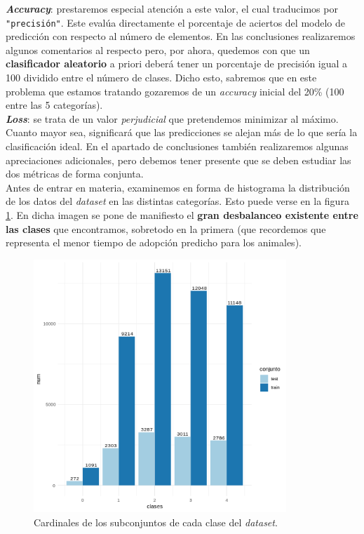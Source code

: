 \documentclass[]{article}
\begin{document}
	{\large \textbf{\textit{Accuracy}}}: prestaremos especial atención a este valor, el cual traducimos por \verb|"precisión"|. Este evalúa directamente el porcentaje de aciertos del modelo de predicción con respecto al número de elementos. En las conclusiones realizaremos algunos comentarios al respecto pero, por ahora, quedemos con que un \textbf{clasificador aleatorio} a priori deberá tener un porcentaje de precisión igual a 100 dividido entre el número de clases. Dicho esto, sabremos que en este problema que estamos tratando gozaremos de un \textit{accuracy} inicial del 20\% (100 entre las 5 categorías).\\
	
	{\large \textbf{\textit{Loss}}}: se trata de un valor \textit{perjudicial} que pretendemos minimizar al máximo. Cuanto mayor sea, significará que las predicciones se alejan más de lo que sería la clasificación ideal. En el apartado de conclusiones también realizaremos algunas apreciaciones adicionales, pero debemos tener presente que se deben estudiar las dos métricas de forma conjunta.\\
	
	Antes de entrar en materia, examinemos en forma de histograma la distribución de los datos del \textit{dataset} en las distintas categorías. Esto puede verse en la figura \ref{histogram}. En dicha imagen se pone de manifiesto el \textbf{gran desbalanceo existente entre las clases} que encontramos, sobretodo en la primera (que recordemos que representa el menor tiempo de adopción predicho para los animales).\\
	
	\begin{figure}[h]
		\centering
		\includegraphics[width=0.85\textwidth]{./img/bp_dataset_particionado}
		\caption{Cardinales de los subconjuntos de cada clase del \textit{dataset}.}
		\label{histogram}
	\end{figure}
\end{document}
